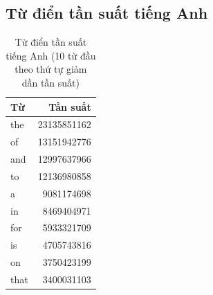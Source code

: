 \subsection*{Từ điển tần suất tiếng Anh}
\begin{table}[htb]
    \centering
    \caption{Từ điển tần suất tiếng Anh (10 từ đầu theo thứ tự giảm dần tần suất)}
    \begin{tabular}{l r}
        \toprule
        \textbf{Từ} & \textbf{Tần suất} \\\midrule
        the         & 23135851162       \\
        of          & 13151942776       \\
        and         & 12997637966       \\
        to          & 12136980858       \\
        a           & 9081174698        \\
        in          & 8469404971        \\
        for         & 5933321709        \\
        is          & 4705743816        \\
        on          & 3750423199        \\
        that        & 3400031103        \\
        \bottomrule
    \end{tabular}
\end{table}

\newpage
